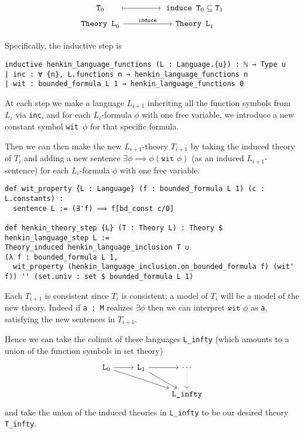 \[\begin{tikzcd}[row sep = tiny]
	{\texttt{T}_0} && {\texttt{induce T}_0 \subs \texttt{T}_1} \\
	{\texttt{Theory L}_0} && {\texttt{Theory L}_1}
	\arrow["{\texttt{induce}}", from=2-1, to=2-3]
	\arrow[shorten <=17pt, shorten >=2pt, maps to, from=1-1, to=1-3]
\end{tikzcd}\]

Specifically, the inductive step is
\begin{lstlisting}
inductive henkin_language_functions (L : Language.{u}) : ℕ → Type u
| inc : ∀ {n}, L.functions n → henkin_language_functions n
| wit : bounded_formula L 1 → henkin_language_functions 0 \end{lstlisting}
At each step we make a language $L_{i+1}$
inheriting all the function symbols from $L_{i}$ via \texttt{inc},
and for each $L_{i}$-formula $\phi$ with one free variable, we introduce a
new constant symbol \texttt{wit $\phi$} for that specific formula.

Then we can then make the new $L_{i+1}$-theory $T_{i+1}$ by taking the induced theory of
$T_{i}$ and adding a new sentence $\exists \phi \implies \phi(\texttt{wit } \phi)$
(as an induced $L_{i+1}$-sentence) for each $L_{i}$-formula $\phi$ with one free variable.

\begin{lstlisting}
def wit_property {L : Language} (f : bounded_formula L 1) (c : L.constants) :
  sentence L := (∃'f) ⟹ f[bd_const c/0]

def henkin_theory_step {L} (T : Theory L) : Theory $ henkin_language_step L :=
Theory_induced henkin_language_inclusion T ∪
(λ f : bounded_formula L 1,
  wit_property (henkin_language_inclusion.on_bounded_formula f) (wit' f)) '' (set.univ : set $ bounded_formula L 1)
\end{lstlisting}

Each $T_{i+1}$ is consistent since $T_{i}$ is consistent;
a model of $T_{i}$ will be a model of the new theory.
Indeed if \texttt{a : M} realizes $\exists \phi$
then we can interpret $\texttt{wit } \phi$ as \texttt{a},
satisfying the new sentences in $T_{i+1}$.

Hence we can take the colimit of these languages \texttt{L\_infty}
(which amounts to a union of the function symbols in set theory)
\[\begin{tikzcd}
	{\texttt{L}_0} & {\texttt{L}_1} & \cdots \\
	&& {\texttt{L\_infty}}
	\arrow[from=1-1, to=1-2]
	\arrow[from=1-2, to=1-3]
	\arrow[from=1-1, to=2-3]
	\arrow[from=1-2, to=2-3]
	\arrow[dotted, from=1-3, to=2-3]
\end{tikzcd}\]
and take the union of the induced theories in \texttt{L\_infty}
to be our desired theory \texttt{T\_infty}.

